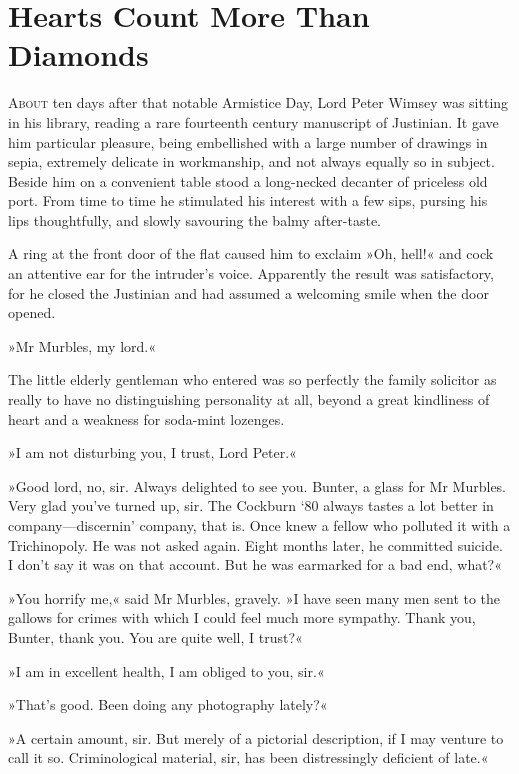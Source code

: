 \chapter{Hearts Count More Than Diamonds}
\lettrine[lines=4]{A}{bout} ten days after that notable Armistice Day, Lord Peter Wimsey was sitting in his library, reading a rare fourteenth century manuscript of Justinian. It gave him particular pleasure, being embellished with a large number of drawings in sepia, extremely delicate in workmanship, and not always equally so in subject. Beside him on a convenient table stood a long-necked decanter of priceless old port. From time to time he stimulated his interest with a few sips, pursing his lips thoughtfully, and slowly savouring the balmy after-taste.

A ring at the front door of the flat caused him to exclaim »Oh, hell!« and cock an attentive ear for the intruder's voice. Apparently the result was satisfactory, for he closed the Justinian and had assumed a welcoming smile when the door opened.

»Mr Murbles, my lord.«

The little elderly gentleman who entered was so perfectly the family solicitor as really to have no distinguishing personality at all, beyond a great kindliness of heart and a weakness for soda-mint lozenges.

»I am not disturbing you, I trust, Lord Peter.«

»Good lord, no, sir. Always delighted to see you. Bunter, a glass for Mr Murbles. Very glad you've turned up, sir. The Cockburn `80 always tastes a lot better in company—discernin' company, that is. Once knew a fellow who polluted it with a Trichinopoly. He was not asked again. Eight months later, he committed suicide. I don't say it was on that account. But he was earmarked for a bad end, what?«

»You horrify me,« said Mr Murbles, gravely. »I have seen many men sent to the gallows for crimes with which I could feel much more sympathy. Thank you, Bunter, thank you. You are quite well, I trust?«

»I am in excellent health, I am obliged to you, sir.«

»That's good. Been doing any photography lately?«

»A certain amount, sir. But merely of a pictorial description, if I may venture to call it so. Criminological material, sir, has been distressingly deficient of late.«

